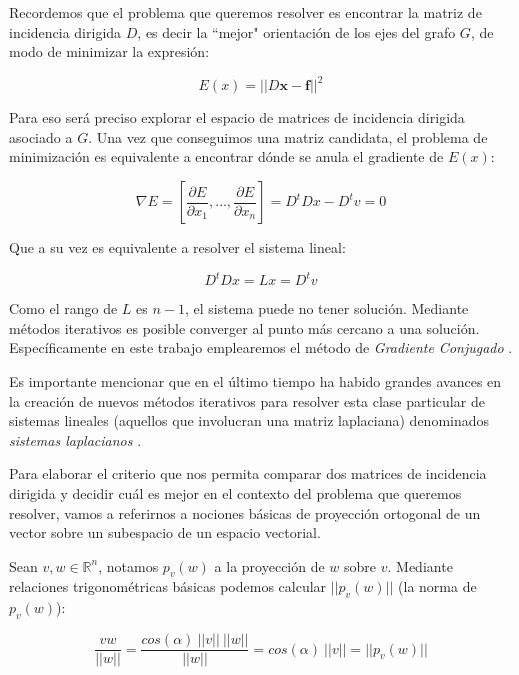 \documentclass[10pt, a4paper, twocolumn]{article} %
\begin{document}
\bigskip


Recordemos que el problema que queremos resolver es encontrar la matriz 
de incidencia dirigida $D$, es decir la ``mejor" orientación de los ejes 
del grafo $G$, de modo de minimizar la expresión:

$$E(x) = ||D\bm{x}-\bm{f}||^2$$

Para eso será preciso explorar el espacio de matrices de 
incidencia dirigida asociado a $G$. Una vez que conseguimos una 
matriz candidata, el problema de minimización es equivalente a encontrar
dónde se anula el gradiente de $E(x)$:
 
$$\nabla E = [\frac{\partial E}{\partial x_1}, \dots, \frac{\partial 
E}{\partial x_n}] = D^tDx-D^tv=0$$

Que a su vez es equivalente a resolver el sistema lineal:

$$D^tDx = Lx = D^tv$$

Como el rango de $L$ es $n-1$, el sistema puede no tener solución. 
Mediante métodos iterativos es posible converger al punto más cercano a 
una solución. Específicamente en este trabajo emplearemos el método de 
\textit{Gradiente Conjugado} \cite{Saad:2007}.

\smallskip

Es importante mencionar que en el último 
tiempo ha habido grandes avances en la creación de nuevos métodos 
iterativos para resolver esta clase particular de sistemas lineales 
(aquellos que involucran una matriz laplaciana) denominados 
\textit{sistemas laplacianos} \cite{KMP:2010,Spielman:2010,ST:2004,
Teng:2010}.

\bigskip


Para elaborar el criterio que nos permita comparar dos matrices de 
incidencia dirigida y decidir cuál es mejor en el contexto del problema 
que queremos resolver, vamos a referirnos a nociones básicas de 
proyección ortogonal de un vector sobre un subespacio de un espacio 
vectorial.

\smallskip

Sean $v,w \in \mathbb{R}^n$, notamos $p_v(w)$ a la proyección de $w$ 
sobre $v$. Mediante relaciones trigonométricas básicas podemos 
calcular $||p_v(w)||$ (la norma de $p_v(w)$):

$$\frac{v w}{||w||} = \frac{cos(\alpha) \ ||v|| \ ||w||}{||w||} = 
cos(\alpha) \ ||v|| = ||p_v(w)||$$
\end{document}
